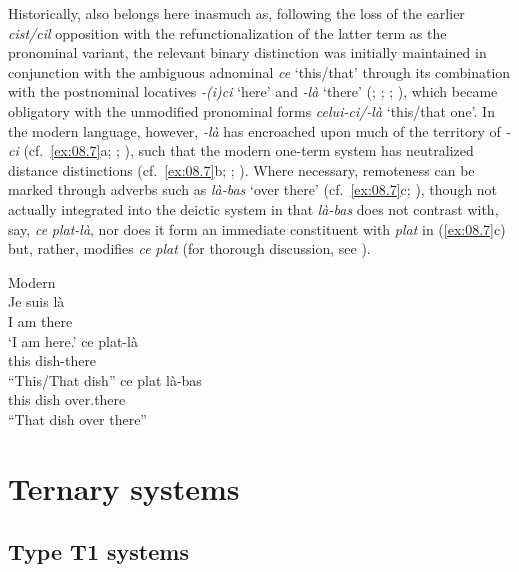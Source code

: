 \documentclass[output=paper]{langsci/langscibook}
\begin{document}
Historically,  also belongs here inasmuch as, following the loss of the
earlier \emph{cist/cil} opposition with the refunctionalization of the latter
term as the pronominal variant, the relevant binary distinction was initially
maintained in conjunction with the ambiguous adnominal \emph{ce} ‘this/that’
through its combination with the postnominal locatives
\emph{\nobreakdash-(i)ci} ‘here’ and \emph{{}-là} ‘there’
(\citealt[325]{Brunot:1899a}; \citealt[424f]{Nyrop:1925a};
\citealt[292f]{Nyrop:1925ab}; \citealt[123, 126]{Price:1971a}), which became
obligatory with the unmodified pronominal forms \emph{celui\nobreakdash-ci/-là}
‘this/that one’. In the modern language, however, \emph{\nobreakdash-là} has
encroached upon much of the territory of \emph{{}-ci} (cf.\ \ref{ex:08.7}a;
\citealt[127]{Price:1971a}; \citealt[§2]{Smith:1995a}), such
that the modern  one-term system has neutralized distance distinctions
(cf.\ \ref{ex:08.7}b; \citealt[§3.4]{Da-Milano:2007a}; \citealt[67f]{Rowlett:2007a}).
Where necessary, remoteness can be marked through adverbs such as \emph{là-bas}
‘over there’ (cf.\ \ref{ex:08.7}c; \citealt{Brault:2004a}), though not actually
integrated into the deictic system in that \emph{là-bas} does not contrast
with, say, \emph{ce} \emph{plat-là}, nor does it form an immediate constituent
with \emph{plat} in (\ref{ex:08.7}c) but, rather, modifies \emph{ce}
\emph{plat} (for thorough discussion, see \citealt[n.5]{Smith:1995a}).

\ea\label{ex:08.7}Modern  \citep{Smith:1995a}\\
\ea
\gll  Je  suis  là\\
I  am  there\\
\glt \enquote*{I am here.}
\ex
\gll  ce  plat-là\\
this  dish-there\\
\glt \enquote{This/That dish}
\ex
\gll  ce  plat  là-bas\\
this  dish  over.there\\
\glt \enquote{That dish over there}
\z
\z

\section{Ternary systems}\label{bkm:Ref370483101}

\subsection{Type T1 systems}
\end{document}

